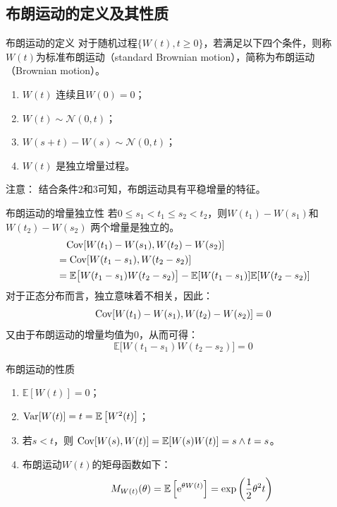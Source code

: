\documentclass[t]{beamer}
\newcommand{\E}{\mathbb{E}}
\begin{document}
\subsection{布朗运动的定义及其性质}
\begin{frame}{布朗运动的定义}
  对于随机过程$\{W(t),t\ge 0\}$，若满足以下四个条件，则称$W(t)$为标准布朗运动（standard Brownian motion），简称为布朗运动（Brownian motion）。
  \begin{enumerate}
  \item $W(t)$ 连续且$W(0)=0$；
  \item $W(t)\sim \mathcal{N}(0,t)$； 	 
  \item $W(s+t)-W(s)\sim \mathcal{N}(0,t)$； 
  \item $W(t)$  是独立增量过程。
  \end{enumerate} 
  \begin{block}{注意：}
    结合条件2和3可知，布朗运动具有平稳增量的特征。
  \end{block}
\end{frame}


\begin{frame}{布朗运动的增量独立性}
  若$0\le s_1<t_1\le s_2<t_2$，则$W(t_1)-W(s_1)$和$W(t_2)-W(s_2)$ 两个增量是独立的。
  \[\begin{split}
    &\quad {\rm Cov}[W(t_1)-W(s_1), W(t_2)-W(s_2)]\\
    &={\rm Cov}[W(t_1-s_1), W(t_2-s_2)]\\
    &=\E \big[W(t_1-s_1)W(t_2-s_2)\big]-\E [W(t_1-s_1)] \E [W(t_2-s_2)]\\
    \end{split} \]
    对于正态分布而言，独立意味着不相关，因此：
    $${\rm Cov}[W(t_1)-W(s_1), W(t_2)-W(s_2)]=0$$
    又由于布朗运动的增量均值为0，从而可得：
    \[\E \big[W(t_1-s_1)W(t_2-s_2)\big]=0 \]
\end{frame}


\begin{frame}{布朗运动的性质}
  \begin{enumerate}
    \item  $ \E [W(t)]=0$；
    \item $ {\rm Var}[W(t)]=t=\E \left[W^{2}(t)\right]$；
    \item 若$s<t$，则 ${\rm Cov}[W(s), W(t)]=\E [W(s) W(t)]=s\wedge t=s$。
    \item 布朗运动$W(t)$的矩母函数如下：
    \begin{equation*}
      M_{W(t)}(\theta)=\E\left[{\rm e}^{\theta W(t)}\right]=\exp\left(\frac{1}{2}\theta^2 t\right)
    \end{equation*}
    \end{enumerate}
\end{frame}
\end{document}
